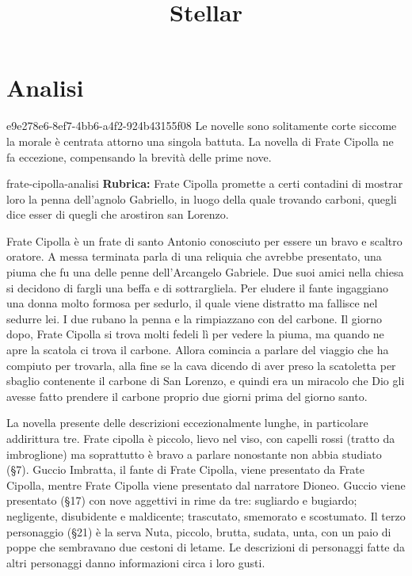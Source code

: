 \documentclass[preview]{standalone}
\begin{document}
\title{Stellar}
\genpage

\section{Analisi}

\begin{snippetnote}{e9e278e6-8ef7-4bb6-a4f2-924b43155f08}{}
    Le novelle sono solitamente corte siccome la morale è centrata attorno una singola battuta.
    La novella di Frate Cipolla ne fa eccezione, compensando la brevità delle prime nove.
\end{snippetnote}

\begin{snippet}{frate-cipolla-analisi}
    \textbf{Rubrica:} Frate Cipolla promette a certi contadini di mostrar loro la penna dell'agnolo Gabriello, in luogo della quale trovando carboni, quegli dice esser di quegli che arostiron san Lorenzo.

    Frate Cipolla è un frate di santo Antonio conosciuto per essere un bravo e scaltro oratore.
    A messa terminata parla di una reliquia che avrebbe presentato, una piuma che fu una delle penne dell'Arcangelo Gabriele.
    Due suoi amici nella chiesa si decidono di fargli una beffa e di sottrargliela.
    Per eludere il fante ingaggiano una donna molto formosa per sedurlo, il quale viene distratto ma fallisce nel sedurre lei.
    I due rubano la penna e la rimpiazzano con del carbone.
    Il giorno dopo, Frate Cipolla si trova molti fedeli lì per vedere la piuma, ma quando ne apre la scatola
    ci trova il carbone. Allora comincia a parlare del viaggio che ha compiuto per trovarla,
    alla fine se la cava dicendo di aver preso la scatoletta per sbaglio contenente il carbone di San Lorenzo,
    e quindi era un miracolo che Dio gli avesse fatto prendere il carbone proprio due giorni prima del giorno santo.
    
    
    La novella presente delle descrizioni eccezionalmente lunghe, in particolare addirittura tre.
    Frate cipolla è piccolo, lievo nel viso, con capelli rossi (tratto da imbroglione) ma
    soprattutto è bravo a parlare nonostante non abbia studiato (§7).
    Guccio Imbratta, il fante di Frate Cipolla, viene presentato da Frate Cipolla,
    mentre Frate Cipolla viene presentato dal narratore Dioneo.
    Guccio viene presentato (§17) con nove aggettivi in rime da tre:
    sugliardo e bugiardo; negligente, disubidente e maldicente; trascutato, smemorato e scostumato.
    Il terzo personaggio (§21) è la serva Nuta, piccolo, brutta, sudata, unta, con un paio di poppe che sembravano due
    cestoni di letame.
    Le descrizioni di personaggi fatte da altri personaggi danno informazioni circa i loro gusti.
    

\end{snippet}
\end{document}
